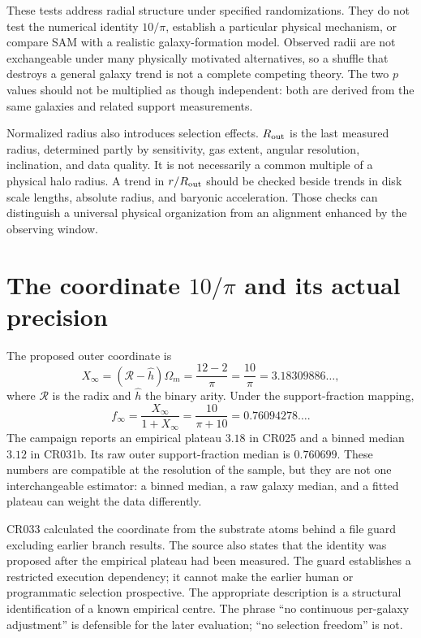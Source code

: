 These tests address radial structure under specified randomizations. They do not test the numerical identity $10/\pi$, establish a particular physical mechanism, or compare SAM with a realistic galaxy-formation model. Observed radii are not exchangeable under many physically motivated alternatives, so a shuffle that destroys a general galaxy trend is not a complete competing theory. The two $p$ values should not be multiplied as though independent: both are derived from the same galaxies and related support measurements.

Normalized radius also introduces selection effects. $R_{\rm out}$ is the last measured radius, determined partly by sensitivity, gas extent, angular resolution, inclination, and data quality. It is not necessarily a common multiple of a physical halo radius. A trend in $r/R_{\rm out}$ should be checked beside trends in disk scale lengths, absolute radius, and baryonic acceleration. Those checks can distinguish a universal physical organization from an alignment enhanced by the observing window.

\section{The coordinate \texorpdfstring{$10/\pi$}{10/pi} and its actual precision}

The proposed outer coordinate is
\begin{equation}
 X_\infty=(\mathcal R-\widehat h)\Omega_m
 =\frac{12-2}{\pi}=\frac{10}{\pi}=3.18309886\ldots,
 \label{c10:coordinate}
\end{equation}
where $\mathcal R$ is the radix and $\widehat h$ the binary arity. Under the support-fraction mapping,
\begin{equation}
 f_\infty=\frac{X_\infty}{1+X_\infty}
 =\frac{10}{\pi+10}=0.76094278\ldots.
 \label{c10:fraction}
\end{equation}
The campaign reports an empirical plateau $3.18$ in CR025 and a binned median $3.12$ in CR031b. Its raw outer support-fraction median is $0.760699$. These numbers are compatible at the resolution of the sample, but they are not one interchangeable estimator: a binned median, a raw galaxy median, and a fitted plateau can weight the data differently.

CR033 calculated the coordinate from the substrate atoms behind a file guard excluding earlier branch results. The source also states that the identity was proposed after the empirical plateau had been measured. The guard establishes a restricted execution dependency; it cannot make the earlier human or programmatic selection prospective. The appropriate description is a structural identification of a known empirical centre. The phrase ``no continuous per-galaxy adjustment'' is defensible for the later evaluation; ``no selection freedom'' is not.

